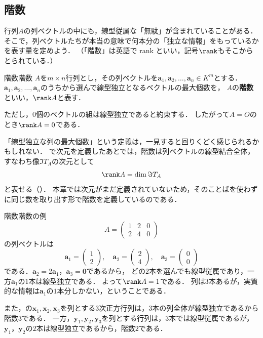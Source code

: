 \subsection{階数}

行列$A$の列ベクトルの中にも，線型従属な「無駄」が含まれていることがある．
そこで，列ベクトルたちが本当の意味で何本分の「独立な情報」をもっているかを表す量を定めよう．
（「階数」は英語で rank といい，記号$\rank$もそこからとられている．）

\begin{definition}{階数}{階数}
  $A$を$m \times n$行列とし，その列ベクトルを$\bm{a}_1, \bm{a}_2, \dots, \bm{a}_n \in K^m$とする．
  $\bm{a}_1, \bm{a}_2, \dots, \bm{a}_n$のうちから選んで線型独立となるベクトルの最大個数を，
  $A$の\textbf{階数}といい，$\rank A$と表す．

  ただし，$0$個のベクトルの組は線型独立であると約束する．
  したがって$A = O$のとき$\rank A = 0$である．
\end{definition}

「線型独立な列の最大個数」という定義は，一見すると回りくどく感じられるかもしれない．
で次元を定義したあとでは，階数は列ベクトルの線型結合全体，すなわち像$\Im T_A$の次元として
\[
  \rank A = \dim \Im T_A
\]
と表せる（）．
本章では次元がまだ定義されていないため，そのことばを使わずに同じ数を取り出す形で階数を定義しているのである．

\begin{example}{階数}{階数の例}
  \[
    A = \begin{pmatrix} 1 & 2 & 0 \\ 2 & 4 & 0 \end{pmatrix}
  \]
  の列ベクトルは
  \[
    \bm{a}_1 = \begin{pmatrix} 1 \\ 2 \end{pmatrix}, \quad
    \bm{a}_2 = \begin{pmatrix} 2 \\ 4 \end{pmatrix}, \quad
    \bm{a}_3 = \begin{pmatrix} 0 \\ 0 \end{pmatrix}
  \]
  である．$\bm{a}_2 = 2\bm{a}_1$，$\bm{a}_3 = \bm{0}$であるから，
  どの$2$本を選んでも線型従属であり，一方$\bm{a}_1$の$1$本は線型独立である．
  よって$\rank A = 1$である．
  列は$3$本あるが，実質的な情報は$\bm{a}_1$の$1$本分しかない，ということである．

  また，の$\bm{x}_1, \bm{x}_2, \bm{x}_3$を列とする$3$次正方行列は，$3$本の列全体が線型独立であるから階数$3$である．
  一方，$\bm{y}_1, \bm{y}_2, \bm{y}_3$を列とする行列は，$3$本では線型従属であるが，$\bm{y}_1$，$\bm{y}_2$の$2$本は線型独立であるから，階数$2$である．
\end{example}

